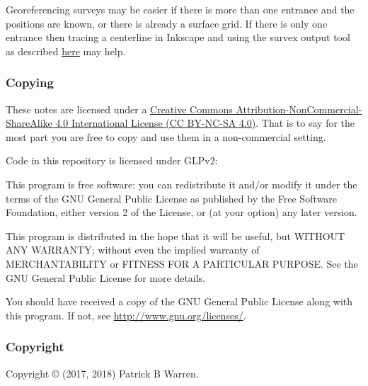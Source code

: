 \documentclass[]{article}
\begin{document}
Georeferencing surveys may be easier if there is more than one entrance
and the positions are known, or there is already a surface grid. If
there is only one entrance then tracing a centerline in Inkscape and
using the survex output tool as described
\href{https://github.com/patrickbwarren/inkscape-survex-export}{here}
may help.

\subsubsection{Copying}\label{copying}

These notes are licensed under a
\href{https://creativecommons.org/licenses/by-nc-sa/4.0/}{Creative
Commons Attribution-NonCommercial-ShareAlike 4.0 International License
(CC BY-NC-SA 4.0)}. That is to say for the most part you are free to
copy and use them in a non-commercial setting.

Code in this repository is licensed under GLPv2:

This program is free software: you can redistribute it and/or modify it
under the terms of the GNU General Public License as published by the
Free Software Foundation, either version 2 of the License, or (at your
option) any later version.

This program is distributed in the hope that it will be useful, but
WITHOUT ANY WARRANTY; without even the implied warranty of
MERCHANTABILITY or FITNESS FOR A PARTICULAR PURPOSE. See the GNU General
Public License for more details.

You should have received a copy of the GNU General Public License along
with this program. If not, see \url{http://www.gnu.org/licenses/}.

\subsubsection{Copyright}\label{copyright}

Copyright © (2017, 2018) Patrick B Warren.
\end{document}
